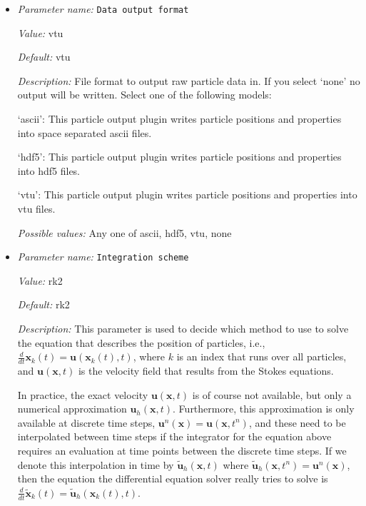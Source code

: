 \begin{itemize}
\item {\it Parameter name:} {\tt Data output format}
\label{parameters:Postprocess/Particles/Data output format}


{\it Value:} vtu


{\it Default:} vtu


{\it Description:} File format to output raw particle data in. If you select `none' no output will be written. Select one of the following models:

`ascii': This particle output plugin writes particle positions and properties into space separated ascii files.

`hdf5': This particle output plugin writes particle positions and properties into hdf5 files.

`vtu': This particle output plugin writes particle positions and properties into vtu files.


{\it Possible values:} Any one of ascii, hdf5, vtu, none
\item {\it Parameter name:} {\tt Integration scheme}
\label{parameters:Postprocess/Particles/Integration scheme}


{\it Value:} rk2


{\it Default:} rk2


{\it Description:} This parameter is used to decide which method to use to solve the equation that describes the position of particles, i.e., $\frac{d}{dt}\mathbf x_k(t) = \mathbf u(\mathbf x_k(t),t)$, where $k$ is an index that runs over all particles, and $\mathbf u(\mathbf x,t)$ is the velocity field that results from the Stokes equations.

In practice, the exact velocity $\mathbf u(\mathbf x,t)$ is of course not available, but only a numerical approximation $\mathbf u_h(\mathbf x,t)$. Furthermore, this approximation is only available at discrete time steps, $\mathbf u^n(\mathbf x)=\mathbf u(\mathbf x,t^n)$, and these need to be interpolated between time steps if the integrator for the equation above requires an evaluation at time points between the discrete time steps. If we denote this interpolation in time by $\tilde{\mathbf u}_h(\mathbf x,t)$ where $\tilde{\mathbf u}_h(\mathbf x,t^n)=\mathbf u^n(\mathbf x)$, then the equation the differential equation solver really tries to solve is $\frac{d}{dt}\tilde{\mathbf x}_k(t) =  \tilde{\mathbf u}_h(\mathbf x_k(t),t)$.


\end{itemize}
